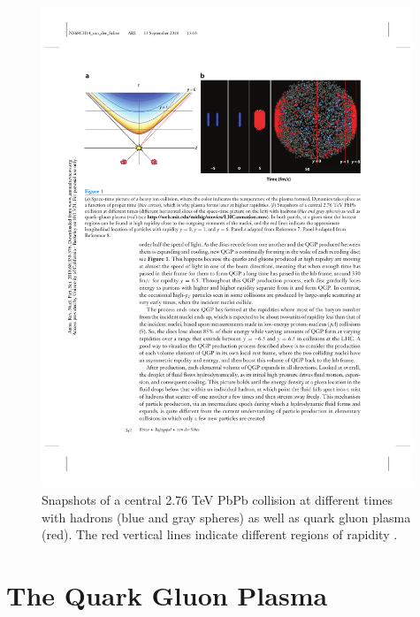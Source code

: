 \begin{figure}[htpb]
  \centering
  \includegraphics[width=0.99\textwidth]{Introduction/collision_snapshot.pdf}
  \caption{Snapshots of a central 2.76 TeV PbPb collision at different times with hadrons (blue and gray spheres) as well as quark gluon plasma (red). The red vertical lines indicate different regions of rapidity \cite{annurev-nucl}.}
  \label{fig:collision_snapshot}
\end{figure}


\section{The Quark Gluon Plasma}\label{sec:QGP}

